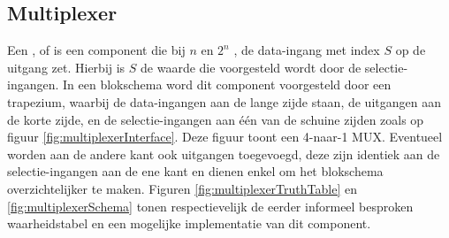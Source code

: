 \subsection{Multiplexer}
\label{ss:multiplexer}
Een ,  of  is een component die bij $n$  en $2^n$ , de data-ingang met index $S$ op de uitgang zet. Hierbij is $S$ de waarde die voorgesteld wordt door de selectie-ingangen. In een blokschema word dit component voorgesteld door een trapezium, waarbij de data-ingangen aan de lange zijde staan, de uitgangen aan de korte zijde, en de selectie-ingangen aan \'e\'en van de schuine zijden zoals op figuur \ref{fig:multiplexerInterface}. Deze figuur toont een 4-naar-1 MUX. Eventueel worden aan de andere kant ook uitgangen toegevoegd, deze zijn identiek aan de selectie-ingangen aan de ene kant en dienen enkel om het blokschema overzichtelijker te maken. Figuren \ref{fig:multiplexerTruthTable} en \ref{fig:multiplexerSchema} tonen respectievelijk de eerder informeel besproken waarheidstabel en een mogelijke implementatie van dit component.
